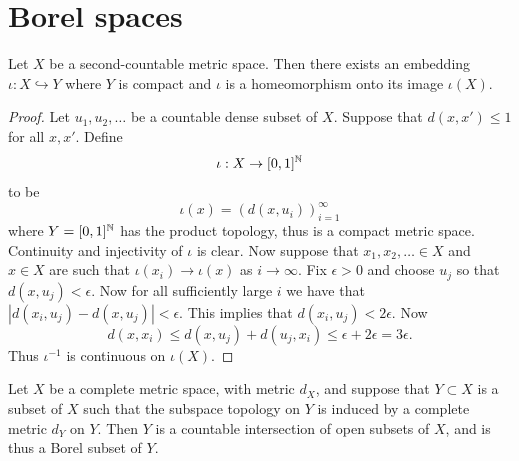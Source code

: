 \documentclass[twoside, a4paper, 10pt]{amsart}
\begin{document}
\section{Borel spaces}

\begin{lemma} Let $X$ be a second-countable metric space. Then there exists an embedding $\iota:X \hookrightarrow Y$ where $Y$ is compact and $\iota$ is a homeomorphism onto its image $\iota(X)$.

\end{lemma}

\begin{proof} Let $u_1,u_2,\ldots $ be a countable dense subset of $X$. Suppose that $d(x,x')\leq 1$ for all $x,x'$. Define $$\iota:X \to [0,1]^{\mathbb{N}}$$ to be $$\iota(x) = (d(x,u_i))_{i=1}^{\infty}$$ where $Y=[0,1]^{\mathbb{N}}$ has the product topology, thus is a compact metric space. Continuity and injectivity of $\iota$ is clear. Now suppose that $x_1,x_2,\ldots \in X$ and $x\in X$ are such that $\iota(x_i) \to \iota(x)$ as $i \to \infty$. Fix $\epsilon>0$ and choose $u_j$ so that $d(x,u_j)<\epsilon$. Now for all sufficiently large $i$ we have that $|d(x_i, u_j) - d(x,u_j)| < \epsilon$. This implies that $d(x_i,u_j) < 2\epsilon$. Now $$d(x,x_i) \leq d(x,u_j) + d(u_j,x_i) \leq \epsilon + 2\epsilon  = 3\epsilon.$$ Thus $\iota^{-1}$ is continuous on $\iota(X)$. \end{proof}

\begin{lemma} Let $X$ be a complete metric space, with metric $d_X$, and suppose that $Y \subset X$ is a subset of $X$ such that the subspace topology on $Y$ is induced by a complete metric $d_Y$ on $Y$. Then $Y$ is a countable intersection of open subsets of $X$, and is thus a Borel subset of $Y$.

\end{lemma}
\end{document}
